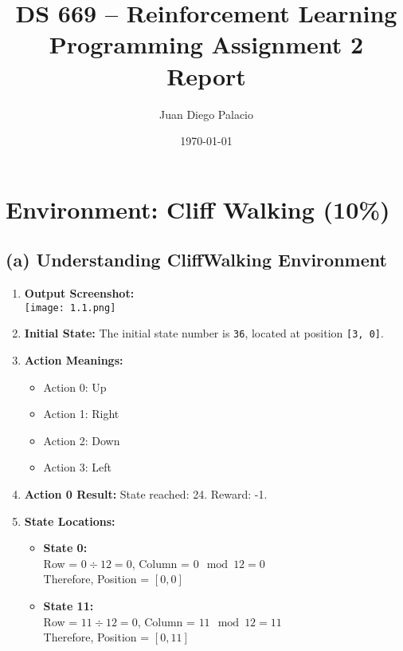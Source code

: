 \documentclass{article}
\title{DS 669 – Reinforcement Learning \\
Programming Assignment 2 Report}
\author{Juan Diego Palacio}
\date{\today}
\begin{document}
\maketitle

\section*{Environment: Cliff Walking (10\%)}

\subsection*{(a) Understanding CliffWalking Environment}

\begin{enumerate}[label=(\arabic*)]
    \item \textbf{Output Screenshot:} \\
    \texttt{[image: 1.1.png]} %

    \item \textbf{Initial State:} The initial state number is \texttt{36}, located at position \texttt{[3, 0]}.

    \item \textbf{Action Meanings:}
    \begin{itemize}
        \item Action 0: Up
        \item Action 1: Right
        \item Action 2: Down
        \item Action 3: Left
    \end{itemize}

    \item \textbf{Action 0 Result:} State reached: 24. Reward: -1.

   \item \textbf{State Locations:}
    \begin{itemize}
        \item \textbf{State 0:} \\
        Row = $0 \div 12 = 0$, \quad Column = $0 \mod 12 = 0$ \\
        Therefore, Position = $[0, 0]$

        \item \textbf{State 11:} \\
        Row = $11 \div 12 = 0$, \quad Column = $11 \mod 12 = 11$ \\
        Therefore, Position = $[0, 11]$


\end{itemize}
\end{enumerate}
\end{document}
